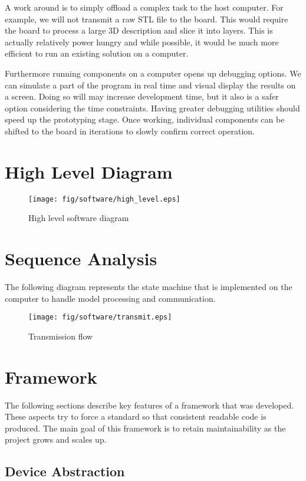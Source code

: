 \documentclass[a4paper, 11pt, twoside]{Thesis}  %
\begin{document}
A work around is to simply offload a complex task to the host computer. For example, we will not transmit a raw STL file to the board. This would require the board to process a large 3D description and slice it into layers. This is actually relatively power hungry and while possible, it would be much more efficient to run an existing solution on a computer.

Furthermore running components on a computer opens up debugging options. We can simulate a part of the program in real time and visual display the results on a screen. Doing so will may increase development time, but it also is a safer option considering the time constraints. Having greater debugging utilities should speed up the prototyping stage. Once working, individual components can be shifted to the board in iterations to slowly confirm correct operation.
\section{High Level Diagram}

\begin{figure}[H]
\centering%
\texttt{[image: fig/software/high\_level.eps]}
\caption{High level software diagram}
\label{fig:high_level.eps}
\end{figure}\section{Sequence Analysis}

The following diagram represents the state machine that is implemented on the computer to handle model processing and communication. 

\begin{figure}[H]
\centering%
\texttt{[image: fig/software/transmit.eps]}
\caption{Transmission flow}
\label{fig:transmit.eps}
\end{figure}


\section{Framework}

The following sections describe key features of a framework that was developed. These aspects try to force a standard so that consistent readable code is produced. The main goal of this framework is to retain maintainability as the project grows and scales up.

\subsection{Device Abstraction}
\end{document}
